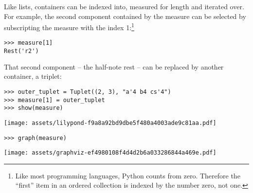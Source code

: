 \noindent Like lists, containers can be indexed into, measured for length and
iterated over. For example, the second component contained by the measure can
be selected by subscripting the measure with the index 1:\footnote{Like most
programming languages, Python counts from zero. Therefore the \enquote{first}
item in an ordered collection is indexed by the number zero, not one.}

\begin{comment}
<abjad>
measure[1]
</abjad>
\end{comment}

\begin{abjadbookoutput}
\begin{singlespacing}
\vspace{-0.5\baselineskip}
\begin{verbatim}
>>> measure[1]
Rest('r2')
\end{verbatim}
\end{singlespacing}
\end{abjadbookoutput}

\noindent That second component -- the half-note rest -- can be replaced by
another container, a triplet:

\begin{comment}
<abjad>
outer_tuplet = Tuplet((2, 3), "a'4 b4 cs'4")
measure[1] = outer_tuplet
show(measure)
</abjad>
\end{comment}

\begin{abjadbookoutput}
\begin{singlespacing}
\vspace{-0.5\baselineskip}
\begin{verbatim}
>>> outer_tuplet = Tuplet((2, 3), "a'4 b4 cs'4")
>>> measure[1] = outer_tuplet
>>> show(measure)
\end{verbatim}
\noindent\texttt{[image: assets/lilypond-f9a8a92bd9dbe5f480a4003ade9c81aa.pdf]}
\end{singlespacing}
\end{abjadbookoutput}

\begin{comment}
<abjad>
graph(measure)
</abjad>
\end{comment}

\begin{abjadbookoutput}
\begin{singlespacing}
\vspace{-0.5\baselineskip}
\begin{verbatim}
>>> graph(measure)
\end{verbatim}
\noindent\texttt{[image: assets/graphviz-ef4980108f4d4d2b6a033286844a469e.pdf]}
\end{singlespacing}
\end{abjadbookoutput}

